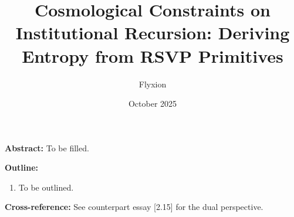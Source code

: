\documentclass[12pt,a4paper]{article}
\title{Cosmological Constraints on Institutional Recursion: Deriving Entropy from RSVP Primitives}
\author{Flyxion}
\date{October 2025}
\begin{document}
\maketitle
\textbf{Abstract:} To be filled.

\bigskip
\textbf{Outline:}
\begin{enumerate}
\item To be outlined.
\end{enumerate}

\bigskip
\textbf{Cross-reference:} See counterpart essay [2.15] for the dual perspective.
\end{document}
